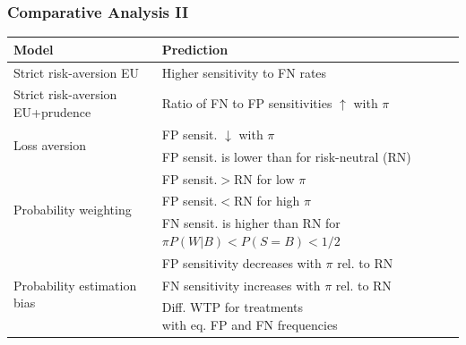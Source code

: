 \documentclass[11pt,hyperref={bookmarks=false}]{beamer}
\begin{document}
\begin{frame}
\frametitle{Comparative Analysis II}
\footnotesize
\begin{table}[htbp]\centering
\begin{tabular}{|llc|}
\hline \hline
\bf Model & \bf Prediction \\
\hline
Strict risk-aversion EU & Higher sensitivity to FN rates \\
\hline
Strict risk-aversion EU+prudence & \makecell[l]{Ratio of FN to FP \\sensitivities $\uparrow$ with $\pi$} \\
\hline
\multirow{2}{*}{Loss aversion} & FP sensit. $\downarrow$ with $\pi$ \\

 & FP sensit. is lower than for risk-neutral (RN) \\
\hline
\multirow{3}{*}{Probability weighting}  & \makecell[l]{FP sensit.$>$RN\\ for low $\pi$} \\

 & \makecell[l]{FP sensit.$<$RN \\for high $\pi$} \\

 & \makecell[l]{FN sensit. is higher  than RN \\for $\pi P(W|B)<P(S=B)<1/2$} \\
\hline
\multirow{3}{*}{Probability estimation bias}& \makecell[l]{FP sensitivity decreases \\with $\pi$ rel. to RN} \\
 & \makecell[l]{FN sensitivity increases \\with $\pi$ rel. to RN} \\
 & \makecell[l]{Diff. WTP for treatments \\with eq. FP and FN frequencies} \\
\hline

\end{tabular}

\end{table}
\end{frame}
\end{document}

